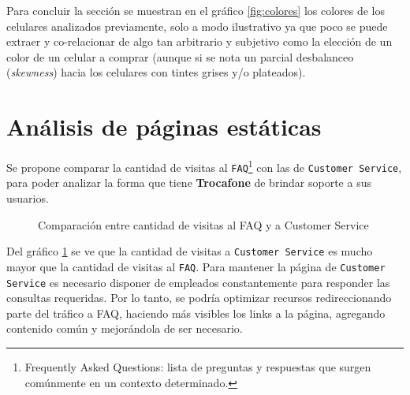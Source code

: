 \documentclass[a4paper]{article}
\begin{document}
Para concluir la sección se muestran en el gráfico \ref{fig:colores} los colores de los celulares analizados previamente, solo a modo ilustrativo ya que poco se puede extraer y co-relacionar de algo tan arbitrario y subjetivo como la elección de un color de un celular a comprar (aunque si se nota un parcial desbalanceo (\textit{skewness}) hacia los celulares con tintes grises y/o plateados).

\section{Análisis de páginas estáticas}

Se propone comparar la cantidad de visitas al \texttt{FAQ}\footnote{Frequently Asked Questions: lista de preguntas y respuestas que surgen comúnmente en un contexto determinado.} con las de \texttt{Customer Service}, para poder analizar la forma que tiene \textbf{Trocafone} de brindar soporte a sus usuarios.

\begin{figure}[!h]
	\caption{Comparación entre cantidad de visitas al FAQ y a Customer Service}
	\label{fig:staticpage}
\end{figure}

Del gráfico \ref{fig:staticpage} se ve que la cantidad de visitas a \texttt{Customer Service} es mucho mayor que la cantidad de visitas al \texttt{FAQ}. Para mantener la página de \texttt{Customer Service} es necesario disponer de empleados constantemente para responder las consultas requeridas. Por lo tanto, se podría optimizar recursos redireccionando parte del tráfico a FAQ, haciendo más visibles los links a la página, agregando contenido común y mejorándola de ser necesario.
\end{document}

